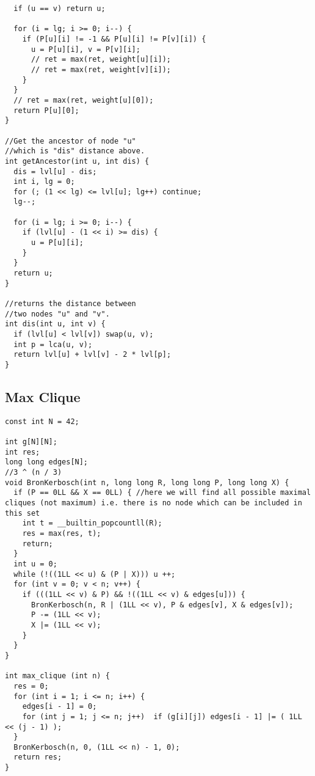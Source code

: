 \documentclass[10pt,a4paper,onesided]{article}
\begin{document}
\begin{multicols*}{3}
\begin{lstlisting}
  if (u == v) return u;

  for (i = lg; i >= 0; i--) {
    if (P[u][i] != -1 && P[u][i] != P[v][i]) {
      u = P[u][i], v = P[v][i];
      // ret = max(ret, weight[u][i]);
      // ret = max(ret, weight[v][i]);
    }
  }
  // ret = max(ret, weight[u][0]);
  return P[u][0];
}

//Get the ancestor of node "u"
//which is "dis" distance above.
int getAncestor(int u, int dis) {
  dis = lvl[u] - dis;
  int i, lg = 0;
  for (; (1 << lg) <= lvl[u]; lg++) continue;
  lg--;

  for (i = lg; i >= 0; i--) {
    if (lvl[u] - (1 << i) >= dis) {
      u = P[u][i];
    }
  }
  return u;
}

//returns the distance between
//two nodes "u" and "v".
int dis(int u, int v) {
  if (lvl[u] < lvl[v]) swap(u, v);
  int p = lca(u, v);
  return lvl[u] + lvl[v] - 2 * lvl[p];
}
\end{lstlisting}
\subsection{Max Clique}
\begin{lstlisting}
const int N = 42;

int g[N][N];
int res;
long long edges[N];
//3 ^ (n / 3)
void BronKerbosch(int n, long long R, long long P, long long X) {
  if (P == 0LL && X == 0LL) { //here we will find all possible maximal cliques (not maximum) i.e. there is no node which can be included in this set
    int t = __builtin_popcountll(R);
    res = max(res, t);
    return;
  }
  int u = 0;
  while (!((1LL << u) & (P | X))) u ++;
  for (int v = 0; v < n; v++) {
    if (((1LL << v) & P) && !((1LL << v) & edges[u])) {
      BronKerbosch(n, R | (1LL << v), P & edges[v], X & edges[v]);
      P -= (1LL << v);
      X |= (1LL << v);
    }
  }
}

int max_clique (int n) {
  res = 0;
  for (int i = 1; i <= n; i++) {
    edges[i - 1] = 0;
    for (int j = 1; j <= n; j++)  if (g[i][j]) edges[i - 1] |= ( 1LL << (j - 1) );
  }
  BronKerbosch(n, 0, (1LL << n) - 1, 0);
  return res;
}
\end{lstlisting}

\end{multicols*}
\end{document}
